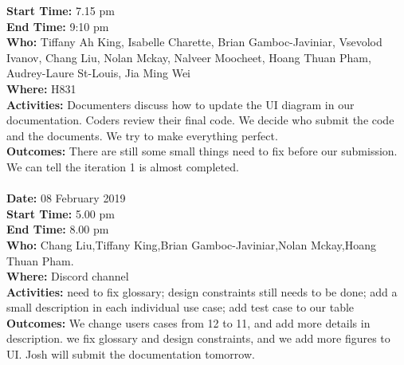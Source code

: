 \documentclass[12pt]{article}
\begin{document}
{\bf Start Time:} 7.15 pm\\
{\bf End Time:}  9:10 pm\\
{\bf Who:} Tiffany Ah King, Isabelle Charette, Brian Gamboc-Javiniar, Vsevolod Ivanov, Chang Liu, Nolan Mckay, Nalveer Moocheet, Hoang Thuan Pham, Audrey-Laure St-Louis, Jia Ming Wei\\
{\bf Where:} H831 \\
{\bf Activities:}  Documenters discuss how to update the UI diagram in our documentation. Coders review their final code. We decide who submit the code and the documents. We try to make everything perfect.\\
{\bf Outcomes:} There are still some small things need to fix before our submission. We can tell the iteration 1 is almost completed. \\
\\
{\bf Date:} 08 February 2019\\
{\bf Start Time:} 5.00 pm\\
{\bf End Time:} 8.00 pm \\
{\bf Who:} Chang Liu,Tiffany King,Brian Gamboc-Javiniar,Nolan Mckay,Hoang Thuan Pham.\\
{\bf Where:} Discord channel \\
{\bf Activities:} need to fix glossary;  design constraints still needs to be done; add a small description in each individual use case; add test case to our table\\
{\bf Outcomes:} We change users cases from 12 to 11, and add more details in description. we fix glossary and design constraints, and we add more figures to UI. Josh will submit the documentation tomorrow. \\
\newpage
\end{document}
